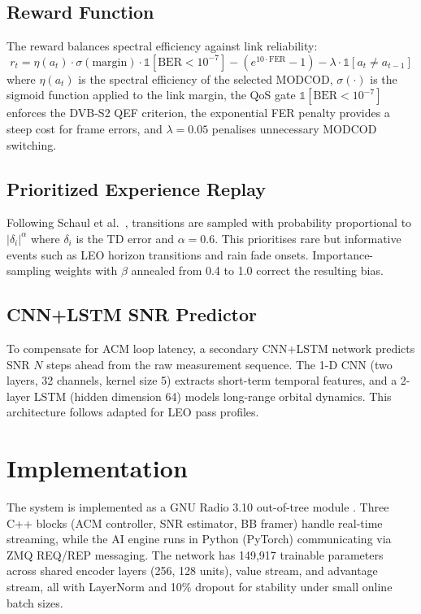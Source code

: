 \documentclass[conference]{IEEEtran}
\begin{document}
\subsection{Reward Function}

The reward balances spectral efficiency against link reliability:
\begin{equation}
r_t = \eta(a_t) \cdot \sigma(\text{margin}) \cdot \mathbb{1}[\text{BER} < 10^{-7}] - \left(e^{10 \cdot \text{FER}} - 1\right) - \lambda \cdot \mathbb{1}[a_t \neq a_{t-1}]
\label{eq:reward}
\end{equation}
where $\eta(a_t)$ is the spectral efficiency of the selected MODCOD, $\sigma(\cdot)$ is the sigmoid function applied to the link margin, the QoS gate $\mathbb{1}[\text{BER} < 10^{-7}]$ enforces the DVB-S2 QEF criterion, the exponential FER penalty provides a steep cost for frame errors, and $\lambda = 0.05$ penalises unnecessary MODCOD switching.

\subsection{Prioritized Experience Replay}

Following Schaul et al.\ \cite{schaul2016per}, transitions are sampled with probability proportional to $|\delta_i|^\alpha$ where $\delta_i$ is the TD error and $\alpha = 0.6$. This prioritises rare but informative events such as LEO horizon transitions and rain fade onsets. Importance-sampling weights with $\beta$ annealed from 0.4 to 1.0 correct the resulting bias.

\subsection{CNN+LSTM SNR Predictor}

To compensate for ACM loop latency, a secondary CNN+LSTM network predicts SNR $N$ steps ahead from the raw measurement sequence. The 1-D CNN (two layers, 32 channels, kernel size 5) extracts short-term temporal features, and a 2-layer LSTM (hidden dimension 64) models long-range orbital dynamics. This architecture follows \cite{mdpi2024snr} adapted for LEO pass profiles.

\section{Implementation}

The system is implemented as a GNU Radio 3.10 out-of-tree module \cite{gr_dvbs2}. Three C++ blocks (ACM controller, SNR estimator, BB framer) handle real-time streaming, while the AI engine runs in Python (PyTorch) communicating via ZMQ REQ/REP messaging. The network has 149,917 trainable parameters across shared encoder layers (256, 128 units), value stream, and advantage stream, all with LayerNorm and 10\% dropout for stability under small online batch sizes.
\end{document}

